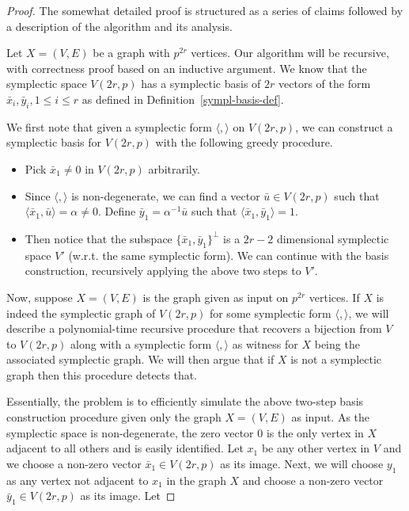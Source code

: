 \documentclass[10pt,a4paper]{amsart}
\newcommand{\sympl}[1]{\langle #1 \rangle}
\begin{document}
\begin{proof}
  The somewhat detailed proof is structured as a series of claims
  followed by a description of the algorithm and its analysis.

  Let $X=(V,E)$ be a graph with $p^{2r}$ vertices. Our algorithm will
  be recursive, with correctness proof based on an inductive
  argument. We know that the symplectic space $V(2r,p)$ has a
  symplectic basis of $2r$ vectors of the form
  $\bar{x}_i, \bar{y}_i, 1\le i\le r$ as defined in
  Definition~\ref{sympl-basis-def}.


We first note that given a symplectic form $\sympl{,}$ on $V(2r,p)$,
we can construct a symplectic basis for $V(2r,p)$ with the following
greedy procedure.
\begin{itemize}
\item Pick $\bar{x}_1\ne 0$ in $V(2r,p)$ arbitrarily.
\item Since $\sympl{,}$ is non-degenerate, we can find a vector
  $\bar{u}\in V(2r,p)$ such that $\sympl{\bar{x}_1,\bar{u}}=\alpha\ne
  0$.  Define $\bar{y}_1 =\alpha^{-1}\bar{u}$ such that
  $\sympl{\bar{x}_1,\bar{y}_1}=1$.
\item Then notice that the subspace $\{\bar{x}_1,\bar{y}_1\}^\perp$ is
  a $2r-2$ dimensional symplectic space $V'$ (w.r.t. the same
  symplectic form). We can continue with the basis construction,
  recursively applying the above two steps to $V'$.
\end{itemize}

Now, suppose $X=(V,E)$ is the graph given as input on $p^{2r}$
vertices. If $X$ is indeed the symplectic graph of $V(2r,p)$ for some
symplectic form $\sympl{,}$, we will describe a polynomial-time
recursive procedure that recovers a bijection from $V$ to $V(2r,p)$
along with a symplectic form $\sympl{,}$ as witness for $X$ being the
associated symplectic graph. We will then argue that if $X$ is not a
symplectic graph then this procedure detects that.

Essentially, the problem is to efficiently simulate the above two-step
basis construction procedure given only the graph $X=(V,E)$ as input.
As the symplectic space is non-degenerate, the zero vector $0$ is the
only vertex in $X$ adjacent to all others and is easily identified.
Let $x_1$ be any other vertex in $V$ and we choose a non-zero vector
$\bar{x}_1\in V(2r,p)$ as its image. Next, we will choose $y_1$ as any
vertex not adjacent to $x_1$ in the graph $X$ and choose a non-zero
vector $\bar{y}_1\in V(2r,p)$ as its image. Let


\end{proof}
\end{document}
